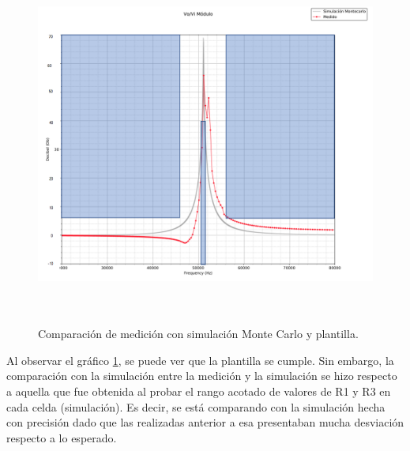  \begin{figure}[H] %
	\centering	\includegraphics[width=12cm,height=12cm,keepaspectratio]{../EJ4/graficos/PLANTILLA_BIEN.png}
	\caption{Comparaci\'on de medici\'on con simulaci\'on Monte Carlo y plantilla.}
	\label{plantilla}
\end{figure}

Al observar el gr\'afico \ref{plantilla}, se puede ver que la plantilla se cumple. Sin embargo, la comparaci\'on con la simulaci\'on entre la medici\'on y la simulaci\'on se hizo respecto a aquella que fue obtenida al probar el rango acotado de valores de R1 y R3 en cada celda (simulaci\'on). Es decir, se est\'a comparando con la simulaci\'on hecha con precisi\'on dado que las realizadas anterior a esa presentaban mucha desviaci\'on respecto a lo esperado.


